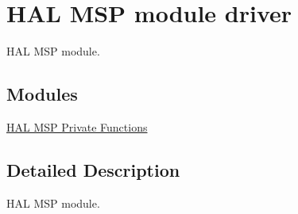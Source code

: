 \hypertarget{group___h_a_l___m_s_p}{}\section{H\+AL M\+SP module driver}
\label{group___h_a_l___m_s_p}


H\+AL M\+SP module.  


\subsection*{Modules}
\begin{DoxyCompactItemize}
\item 
\hyperlink{group___h_a_l___m_s_p___private___functions}{H\+A\+L M\+S\+P Private Functions}
\end{DoxyCompactItemize}


\subsection{Detailed Description}
H\+AL M\+SP module. 

